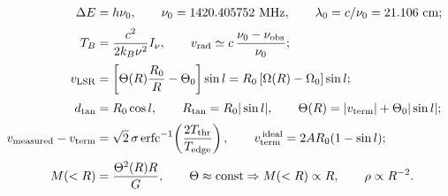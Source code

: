 \documentclass[11pt,a4paper]{article}
\begin{document}
\begin{align*}
\Delta E &= h\nu_{0}, \qquad \nu_{0} = 1420.405752\ \mathrm{MHz},
           \qquad \lambda_{0} = c/\nu_{0} = 21.106\ \mathrm{cm}; \\[2pt]
T_{B} &= \frac{c^{2}}{2k_{B}\nu^{2}}I_{\nu}, \qquad
      v_{\mathrm{rad}} \simeq c\,\frac{\nu_{0}-\nu_{\mathrm{obs}}}{\nu_{0}}; \\[2pt]
v_{\mathrm{LSR}} &= \left[\Theta(R)\frac{R_{0}}{R}-\Theta_{0}\right]\sin l
       = R_{0}\left[\Omega(R)-\Omega_{0}\right]\sin l; \\[2pt]
d_{\mathrm{tan}} &= R_{0}\cos l, \qquad R_{\mathrm{tan}} = R_{0}|\sin l|, \qquad
\Theta(R) = |v_{\mathrm{term}}| + \Theta_{0}|\sin l|; \\[2pt]
v_{\mathrm{measured}} - v_{\mathrm{term}} &= \sqrt{2}\,\sigma\,
      \mathrm{erfc}^{-1}\!\left(\frac{2T_{\mathrm{thr}}}{T_{\mathrm{edge}}}\right), \qquad
v_{\mathrm{term}}^{\,\mathrm{ideal}} = 2AR_{0}(1-\sin l); \\[2pt]
M(<R) &= \frac{\Theta^{2}(R)R}{G}, \qquad
\Theta \approx \mathrm{const} \Rightarrow M(<R) \propto R, \qquad
\rho \propto R^{-2}.
\end{align*}
\end{document}
